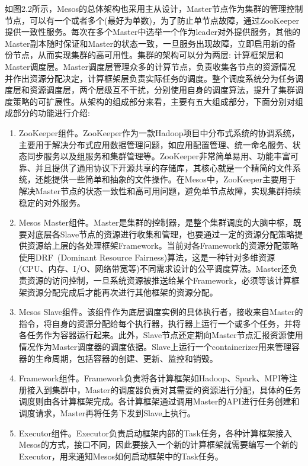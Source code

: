 如图2.2所示，Mesos的总体架构也采用主从设计，Master节点作为集群的管理控制节点，可以有一个或者多个(最好为单数)，为了防止单节点故障，通过ZooKeeper提供一致性服务。每次在多个Master中选举一个作为leader对外提供服务，其他的Master副本随时保证和Master的状态一致，一旦服务出现故障，立即启用新的备份节点，从而实现集群的高可用性。集群的架构可以分为两层: 计算框架层和Master调度层。Master调度层管理众多的计算节点，负责收集各节点的资源情况并作出资源分配决定，计算框架层负责实际任务的调度。整个调度系统分为任务调度层和资源调度层，两个层级互不干扰，分别使用自身的调度算法，提升了集群调度策略的可扩展性。从架构的组成部分来看，主要有五大组成部分，下面分别对组成部分的功能进行介绍:
\begin{enumerate}[1.]
	\item ZooKeeper组件。ZooKeeper作为一款Hadoop项目中分布式系统的协调系统，主要用于解决分布式应用数据管理问题，如应用配置管理、统一命名服务、状态同步服务以及组服务和集群管理等。ZooKeeper非常简单易用、功能丰富可靠、并且提供了通用协议下开源共享的存储库，其核心就是一个精简的文件系统，还能提供一些简单和抽象的文件操作。在Mesos中，ZooKeeper主要用于解决Master节点的状态一致性和高可用问题，避免单节点故障，实现集群持续稳定的对外服务。
	\item Mesos Master组件。Master是集群的控制器，是整个集群调度的大脑中枢，既要对底层各Slave节点的资源进行收集和管理，也要通过一定的资源分配策略提供资源给上层的各处理框架Framework。当前对各Framework的资源分配策略使用DRF~\cite{DRF2011}(Dominant Resource Fairness)算法，这是一种针对多维资源(CPU、内存、I/O、网络带宽等)不同需求设计的公平调度算法。Master还负责资源的访问控制，一旦系统资源被推送给某个Framework，必须等该计算框架资源分配完成后才能再次进行其他框架的资源分配。
	\item Mesos Slave组件。该组件作为底层调度实例的具体执行者，接收来自Master的指令，将自身的资源分配给每个执行器，执行器上运行一个或多个任务，并将各任务作为容器运行起来。此外，Slave节点还定期向Master节点汇报资源使用情况作为Master调度器的调度依据。Slave上运行一个containerizer用来管理容器的生命周期，包括容器的创建、更新、监控和销毁。
	\item Framework组件。Framework负责将各计算框架如Hadoop、Spark、MPI等注册接入到集群中，Master的调度器负责对其需要的资源进行分配，具体的任务调度则由各计算框架完成。各计算框架通过调用Master的API进行任务创建和调度请求，Master再将任务下发到Slave上执行。
	\item Executor组件。Executor负责启动框架内部的Task任务，各种计算框架接入Mesos的方式，接口不同，因此要接入一个新的计算框架就需要编写一个新的Executor，用来通知Mesos如何启动框架中的Task任务。
\end{enumerate}

